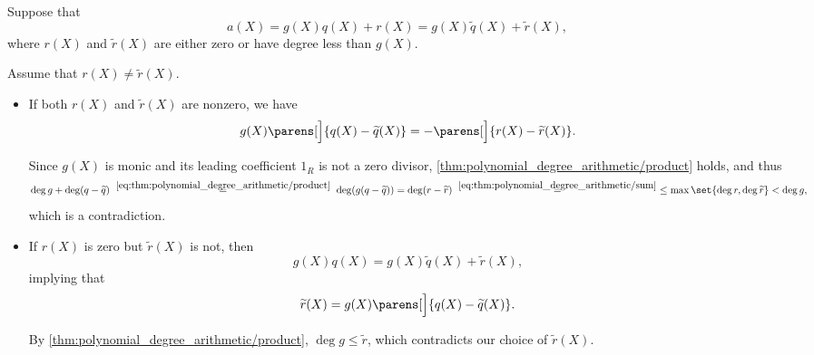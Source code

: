 \begin{defproof}
  \UniquenessSubProof Suppose that
  \begin{equation*}
    a(X) = g(X)q(X) + r(X) = g(X) \widetilde{q}(X) + \widetilde{r}(X),
  \end{equation*}
  where \( r(X) \) and \( \widetilde{r}(X) \) are either zero or have degree less than \( g(X) \).

  Assume that \( r(X) \neq \widetilde{r}(X) \).

  \begin{itemize}
    \item If both \( r(X) \) and \( \widetilde{r}(X) \) are nonzero, we have
    \begin{equation*}
      g(X) \parens[\Big]{ q(X) - \widetilde{q}(X) } = -\parens[\Big]{ r(X) - \widetilde{r}(X) }.
    \end{equation*}

    Since \( g(X) \) is monic and its leading coefficient \( 1_R \) is not a zero divisor, \cref{thm:polynomial_degree_arithmetic/product} holds, and thus
    \begin{equation*}
      \deg g + \deg(q - \widetilde{q})
      \reloset {\eqref{eq:thm:polynomial_degree_arithmetic/product}} =
      \deg(g (q - \widetilde{q}))
      =
      \deg(r - \widetilde{r})
      \reloset {\eqref{eq:thm:polynomial_degree_arithmetic/sum}} =
      \leq \max\set{ \deg r, \deg \widetilde{r} }
      <
      \deg g,
    \end{equation*}
    which is a contradiction.

    \item If \( r(X) \) is zero but \( \widetilde{r}(X) \) is not, then
    \begin{equation*}
      g(X) q(X) = g(X) \widetilde{q}(X) + \widetilde{r}(X),
    \end{equation*}
    implying that
    \begin{equation*}
      \widetilde{r}(X) = g(X) \parens[\Big]{ q(X) - \widetilde{q}(X) }.
    \end{equation*}

    By \eqref{thm:polynomial_degree_arithmetic/product}, \( \deg g \leq \widetilde{r} \), which contradicts our choice of \( \widetilde{r}(X) \).
  \end{itemize}
\end{defproof}

